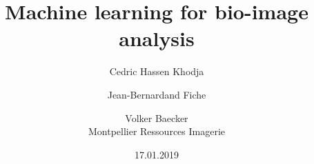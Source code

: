 \documentclass{book}
\begin{document}
\title{Machine learning for bio-image analysis}

\author{Cedric Hassen Khodja \and Jean-Bernardand Fiche \and  Volker Baecker \\ \small Montpellier Ressources Imagerie}

\date{17.01.2019}


\maketitle
\tableofcontents
\listoffigures


%
%
%
%
%



\end{document}
